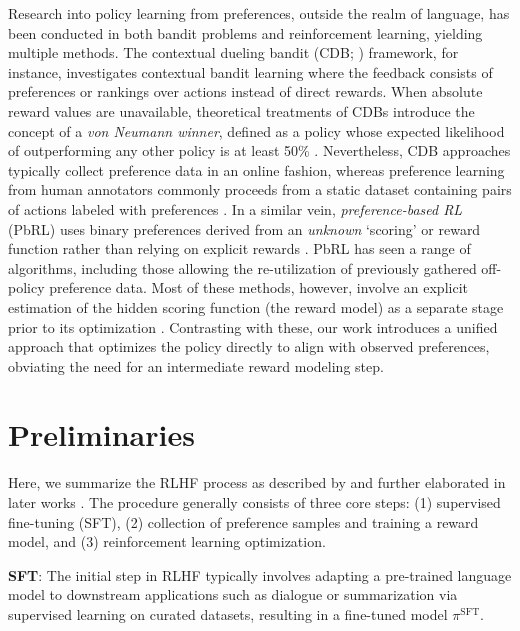 Research into policy learning from preferences, outside the realm of language, has been conducted in both bandit problems and reinforcement learning, yielding multiple methods. The contextual dueling bandit (CDB; \cite{yue2012karmed,dudik2015contextual}) framework, for instance, investigates contextual bandit learning where the feedback consists of preferences or rankings over actions instead of direct rewards. When absolute reward values are unavailable, theoretical treatments of CDBs introduce the concept of a \textit{von Neumann winner}, defined as a policy whose expected likelihood of outperforming any other policy is at least 50\% \citep{dudik2015contextual}. Nevertheless, CDB approaches typically collect preference data in an online fashion, whereas preference learning from human annotators commonly proceeds from a static dataset containing pairs of actions labeled with preferences \citep{yan2022human}. In a similar vein, \textit{preference-based RL} (PbRL) uses binary preferences derived from an \textit{unknown} ‘scoring’ or reward function rather than relying on explicit rewards \citep{BusaFekete2014,ruiz2023dueling}. PbRL has seen a range of algorithms, including those allowing the re-utilization of previously gathered off-policy preference data. Most of these methods, however, involve an explicit estimation of the hidden scoring function (the reward model) as a separate stage prior to its optimization \citep{jain2013learning,BusaFekete2014,christiano2017deep,sadigh2017active,kupcsik2018learning}. Contrasting with these, our work introduces a unified approach that optimizes the policy directly to align with observed preferences, obviating the need for an intermediate reward modeling step.

\section{Preliminaries}\label{section:prelims}

Here, we summarize the RLHF process as described by \citeauthor{ziegler2020finetuning} and further elaborated in later works \citep{stiennon2022learning, bai2022training, ouyang2022training}. The procedure generally consists of three core steps: (1) supervised fine-tuning (SFT), (2) collection of preference samples and training a reward model, and (3) reinforcement learning optimization.

\textbf{SFT}: The initial step in RLHF typically involves adapting a pre-trained language model to downstream applications such as dialogue or summarization via supervised learning on curated datasets, resulting in a fine-tuned model $\pi^\text{SFT}$.

